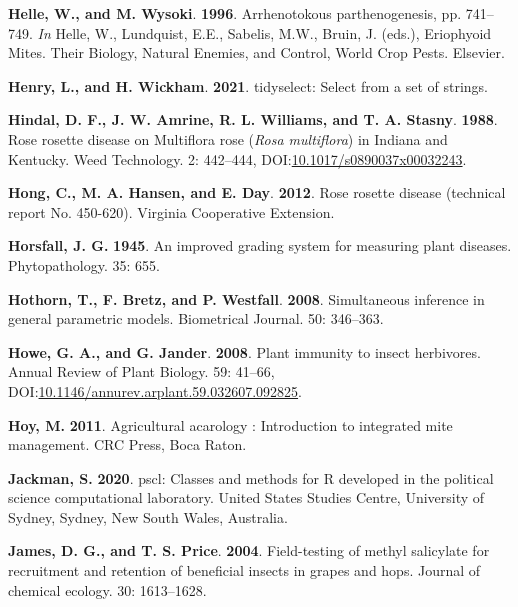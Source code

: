 \documentclass[12pt,final,CPage]{ufthesis}
\newlength{\cslhangindent}
\newenvironment{CSLReferences}[2] %
{%
	\setlength{\parindent}{0pt}
	\ifodd #1 \everypar{\setlength{\hangindent}{\cslhangindent}}\ignorespaces\fi
	\ifnum #2 > 0
	\setlength{\parskip}{#2\baselineskip}
	\fi
}%
{}
\begin{document}
{\begin{CSLReferences}{1}{0}
  \leavevmode{}%
  \textbf{Helle, W., and M. Wysoki}. \textbf{1996}. Arrhenotokous parthenogenesis, pp. 741--749. \emph{In} Helle, W., Lundquist, E.E., Sabelis, M.W., Bruin, J. (eds.), Eriophyoid Mites. Their Biology, Natural Enemies, and Control, World Crop Pests. Elsevier.

  \leavevmode{}%
  \textbf{Henry, L., and H. Wickham}. \textbf{2021}. {tidyselect:} Select from a set of strings.

  \leavevmode{}%
  \textbf{Hindal, D. F., J. W. Amrine, R. L. Williams, and T. A. Stasny}. \textbf{1988}. {Rose rosette disease} on {Multiflora rose} ({\emph{Rosa multiflora}}) in {Indiana} and {Kentucky}. Weed Technology. 2: 442--444, DOI:\href{https://doi.org/10.1017/s0890037x00032243}{10.1017/s0890037x00032243}.

  \leavevmode{}%
  \textbf{Hong, C., M. A. Hansen, and E. Day}. \textbf{2012}. {Rose rosette disease} (technical report No. 450-620). Virginia Cooperative Extension.

  \leavevmode{}%
  \textbf{Horsfall, J. G.} \textbf{1945}. An improved grading system for measuring plant diseases. Phytopathology. 35: 655.

  \leavevmode{}%
  \textbf{Hothorn, T., F. Bretz, and P. Westfall}. \textbf{2008}. Simultaneous inference in general parametric models. Biometrical Journal. 50: 346--363.

  \leavevmode{}%
  \textbf{Howe, G. A., and G. Jander}. \textbf{2008}. Plant immunity to insect herbivores. Annual Review of Plant Biology. 59: 41--66, DOI:\href{https://doi.org/10.1146/annurev.arplant.59.032607.092825}{10.1146/annurev.arplant.59.032607.092825}.

  \leavevmode{}%
  \textbf{Hoy, M.} \textbf{2011}. Agricultural acarology : Introduction to integrated mite management. CRC Press, Boca Raton.

  \leavevmode{}%
  \textbf{Jackman, S.} \textbf{2020}. {pscl}: Classes and methods for {R} developed in the political science computational laboratory. United States Studies Centre, University of Sydney, Sydney, New South Wales, Australia.

  \leavevmode{}%
  \textbf{James, D. G., and T. S. Price}. \textbf{2004}. Field-testing of methyl salicylate for recruitment and retention of beneficial insects in grapes and hops. Journal of chemical ecology. 30: 1613--1628.


\end{CSLReferences}}
\end{document}

